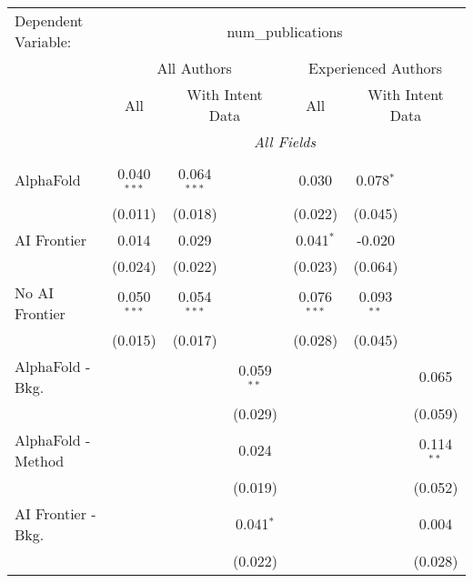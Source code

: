 \begingroup
\centering
\begin{tabular}{lcccccc}
   \tabularnewline \midrule \midrule
   Dependent Variable: & \multicolumn{6}{c}{num\_publications}\\
 & \multicolumn{3}{c}{All Authors} & \multicolumn{3}{c}{Experienced Authors} \\
\cmidrule(lr){2-4} \cmidrule(lr){5-7}
 & \multicolumn{1}{c}{All} & \multicolumn{2}{c}{With Intent Data} & \multicolumn{1}{c}{All} & \multicolumn{2}{c}{With Intent Data} \\
\cmidrule(lr){2-2} \cmidrule(lr){3-4} \cmidrule(lr){5-5} \cmidrule(lr){6-7}
 & \multicolumn{6}{c}{\textit{All Fields}} \\ \\
   AlphaFold               & 0.040$^{***}$ & 0.064$^{***}$ &               & 0.030         & 0.078$^{*}$  &   \\   
                           & (0.011)       & (0.018)       &               & (0.022)       & (0.045)      &   \\   
   AI Frontier             & 0.014         & 0.029         &               & 0.041$^{*}$   & -0.020       &   \\   
                           & (0.024)       & (0.022)       &               & (0.023)       & (0.064)      &   \\   
   No AI Frontier          & 0.050$^{***}$ & 0.054$^{***}$ &               & 0.076$^{***}$ & 0.093$^{**}$ &   \\   
                           & (0.015)       & (0.017)       &               & (0.028)       & (0.045)      &   \\   
   AlphaFold - Bkg.        &               &               & 0.059$^{**}$  &               &              & 0.065\\   
                           &               &               & (0.029)       &               &              & (0.059)\\   
   AlphaFold - Method      &               &               & 0.024         &               &              & 0.114$^{**}$\\   
                           &               &               & (0.019)       &               &              & (0.052)\\   
   AI Frontier - Bkg.      &               &               & 0.041$^{*}$   &               &              & 0.004\\   
                           &               &               & (0.022)       &               &              & (0.028)\\   

\end{tabular}
